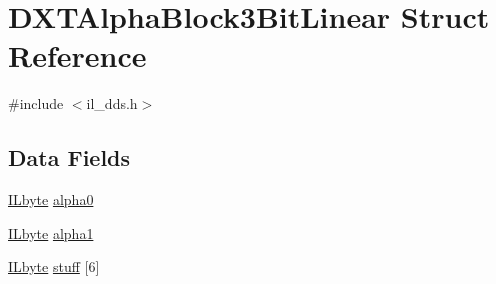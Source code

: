 \hypertarget{struct_d_x_t_alpha_block3_bit_linear}{\section{D\-X\-T\-Alpha\-Block3\-Bit\-Linear Struct Reference}
\label{struct_d_x_t_alpha_block3_bit_linear}
}


{\ttfamily \#include $<$il\-\_\-dds.\-h$>$}

\subsection*{Data Fields}
\begin{DoxyCompactItemize}
\item 
\hyperlink{il_8h_a88e562dacd22f4efcf6f9d31b85d4f92}{I\-Lbyte} \hyperlink{struct_d_x_t_alpha_block3_bit_linear_a2fced5a7ec405e94bb3e753bdbf47748}{alpha0}
\item 
\hyperlink{il_8h_a88e562dacd22f4efcf6f9d31b85d4f92}{I\-Lbyte} \hyperlink{struct_d_x_t_alpha_block3_bit_linear_af71fbe6e2c61e196b03d255ac7b8ed1f}{alpha1}
\item 
\hyperlink{il_8h_a88e562dacd22f4efcf6f9d31b85d4f92}{I\-Lbyte} \hyperlink{struct_d_x_t_alpha_block3_bit_linear_ac6a10604ccd8d03085ad4eac3240b4c8}{stuff} \mbox{[}6\mbox{]}
\end{DoxyCompactItemize}


